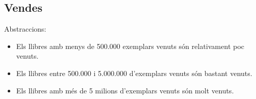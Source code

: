 \subsection{Vendes}
Abstraccions:
\begin{itemize}
  \item Els llibres amb menys de 500.000 exemplars venuts són relativament poc venuts.
  \item Els llibres entre 500.000 i 5.000.000 d'exemplars venuts són bastant venuts.
  \item Els llibres amb més de 5 milions d'exemplars venuts són molt venuts.
\end{itemize}


